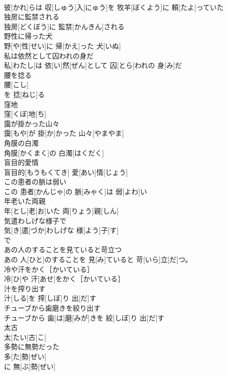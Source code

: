 \documentclass[8pt]{extreport}
\begin{document}
\begin{CJK}{UTF8}{min}
\\	彼[かれ]らは 収[しゅう]入[にゅう]を 牧羊[ぼくよう]に 頼[たよ]っていた
\\	独房に監禁される	
\\	独房[どくぼう]に 監禁[かんきん]される
\\	野性に帰った犬	
\\	野[や]性[せい]に 帰[かえ]った 犬[いぬ]
\\	私は依然として囚われの身だ	
\\	私[わたし]は 依[い]然[ぜん]として 囚[とら]われの 身[み]だ
\\	腰を捻る	
\\	腰[こし]
\\	を 捻[ねじ]る 
\\	窪地	
\\	窪[くぼ]地[ち]
\\	靄が掛かった山々	
\\	靄[もや]が 掛[か]かった 山々[やまやま]
\\	角膜の白濁	
\\	角膜[かくまく]の 白濁[はくだく]
\\	盲目的愛情	
\\	盲目的[もうもくてき] 愛[あい]情[じょう]
\\	この患者の脈は弱い	
\\	この 患者[かんじゃ]の 脈[みゃく]は 弱[よわ]い
\\	年老いた両親	
\\	年[とし]老[お]いた 両[りょう]親[しん]
\\	気遣わしげな様子で	
\\	気[き]遣[づか]わしげな 様[よう]子[す]
\\	で
\\	あの人のすることを見ていると苛立つ	
\\	あの 人[ひと]のすることを 見[み]ていると 苛[いら]立[だ]つ。
\\	冷や汗をかく［かいている］	
\\	冷[ひ]や 汗[あせ]をかく［かいている］
\\	汁を搾り出す	
\\	汁[しる]を 搾[しぼ]り 出[だ]す
\\	チューブから歯磨きを絞り出す	
\\	チューブから 歯[は]磨[みが]きを 絞[しぼ]り 出[だ]す
\\	太古	
\\	太[たい]古[こ]
\\	多勢に無勢だった	
\\	多[た]勢[ぜい]
\\	に 無[ぶ]勢[ぜい]

\end{CJK}
\end{document}
